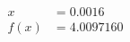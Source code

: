 \documentclass[preview]{standalone}
\begin{document}
\begin{align*}
x &= 0.0016\\f(x) &= 4.0097160
\end{align*}
\end{document}
